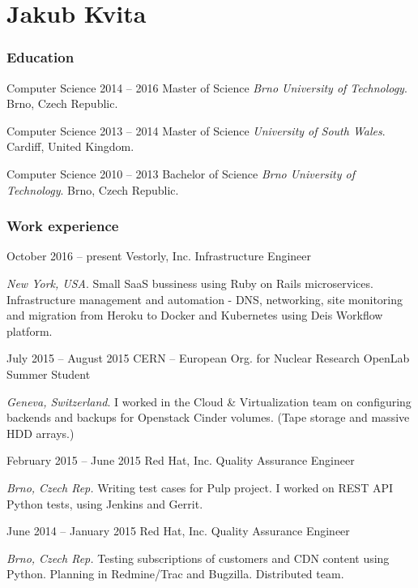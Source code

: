 \documentclass{tccv}
\begin{document}
\part{Jakub Kvita}

\section{Education}

\begin{yearlist}
	
	\item[Computer Science]{2014 -- 2016}
	{Master of Science}
	{\emph{Brno University of Technology}. Brno, Czech Republic.}
	
	\item[Computer Science]{2013 -- 2014}
	{Master of Science}
	{\emph{University of South Wales}. Cardiff, United Kingdom.}
	
	\item[Computer Science]{2010 -- 2013}
	{Bachelor of Science}
	{\emph{Brno University of Technology}. Brno, Czech Republic.}
	
\end{yearlist}

\section{Work experience}

\begin{eventlist}

\item{October 2016 -- present}
{Vestorly, Inc.}
{Infrastructure Engineer}

\emph{New York, USA}. Small SaaS bussiness using Ruby on Rails microservices. Infrastructure management and automation - DNS, networking, site monitoring and migration from Heroku to Docker and Kubernetes using Deis Workflow platform.

\item{July 2015 -- August 2015}
     {CERN -- European Org. for Nuclear Research}
     {OpenLab Summer Student}

\emph{Geneva, Switzerland}. I worked in the Cloud \& Virtualization team on configuring backends and backups for Openstack Cinder volumes. (Tape storage and massive HDD arrays.)

\item{February 2015 -- June 2015}
     {Red Hat, Inc.}
     {Quality Assurance Engineer}

\emph{Brno, Czech Rep.} Writing test cases for Pulp project. I worked on REST API Python tests, using Jenkins and Gerrit.

\item{June 2014 -- January 2015}
     {Red Hat, Inc.}
     {Quality Assurance Engineer}

\emph{Brno, Czech Rep.} Testing subscriptions of customers and CDN content using Python. Planning in Redmine/Trac and Bugzilla. Distributed team.

\end{eventlist}
\end{document}
